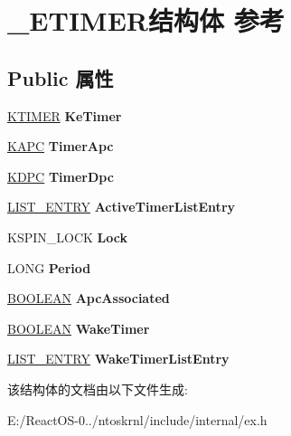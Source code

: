 \hypertarget{struct___e_t_i_m_e_r}{}\section{\+\_\+\+E\+T\+I\+M\+E\+R结构体 参考}
\label{struct___e_t_i_m_e_r}
\subsection*{Public 属性}
\begin{DoxyCompactItemize}
\item 
\mbox{\label{struct___e_t_i_m_e_r_ab5748c7c69a07d924f42d0e198b0785f}} 
\hyperlink{struct___k_t_i_m_e_r}{K\+T\+I\+M\+ER} {\bfseries Ke\+Timer}
\item 
\mbox{\label{struct___e_t_i_m_e_r_a2ce8636810dec75bf02e63e2bf98d6b8}} 
\hyperlink{struct___k_a_p_c}{K\+A\+PC} {\bfseries Timer\+Apc}
\item 
\mbox{\label{struct___e_t_i_m_e_r_a7a12f0f9cea5ae92059267d13ca28ffa}} 
\hyperlink{struct___k_d_p_c}{K\+D\+PC} {\bfseries Timer\+Dpc}
\item 
\mbox{\label{struct___e_t_i_m_e_r_a7675ccccf64f6d59dba8f31a9c82aaee}} 
\hyperlink{struct___l_i_s_t___e_n_t_r_y}{L\+I\+S\+T\+\_\+\+E\+N\+T\+RY} {\bfseries Active\+Timer\+List\+Entry}
\item 
\mbox{\label{struct___e_t_i_m_e_r_a8cfd8be587bb985add3dda357ba5d46c}} 
K\+S\+P\+I\+N\+\_\+\+L\+O\+CK {\bfseries Lock}
\item 
\mbox{\label{struct___e_t_i_m_e_r_a7b12a60b4368cb4024aa4740b52877e3}} 
L\+O\+NG {\bfseries Period}
\item 
\mbox{\label{struct___e_t_i_m_e_r_ab87e19c109c30643dc21d4186f4afb9e}} 
\hyperlink{_processor_bind_8h_a112e3146cb38b6ee95e64d85842e380a}{B\+O\+O\+L\+E\+AN} {\bfseries Apc\+Associated}
\item 
\mbox{\label{struct___e_t_i_m_e_r_a2af28362dc331a7c86f18273b84a7ed5}} 
\hyperlink{_processor_bind_8h_a112e3146cb38b6ee95e64d85842e380a}{B\+O\+O\+L\+E\+AN} {\bfseries Wake\+Timer}
\item 
\mbox{\label{struct___e_t_i_m_e_r_a34e0f5a89c55da28902fd6092707b890}} 
\hyperlink{struct___l_i_s_t___e_n_t_r_y}{L\+I\+S\+T\+\_\+\+E\+N\+T\+RY} {\bfseries Wake\+Timer\+List\+Entry}
\end{DoxyCompactItemize}


该结构体的文档由以下文件生成\+:\begin{DoxyCompactItemize}
\item 
E\+:/\+React\+O\+S-\/0../ntoskrnl/include/internal/ex.\+h\end{DoxyCompactItemize}
